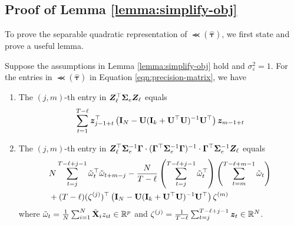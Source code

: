     

    
    \subsection{Proof of Lemma \ref{lemma:simplify-obj}}
    
    
    To prove the separable quadratic representation of $\Prec\left( \hat{\bm{\tau}}\right)$, we first state and prove a useful lemma.  
    \begin{lemma}\label{eqn:carryover-separate-obj}
    Suppose the assumptions in Lemma \ref{lemma:simplify-obj} hold and $\sigma_\varepsilon^2 = 1$. For the entries in $\Prec\left( \hat{\bm{\tau}}\right)$ in Equation \eqref{eqn:precision-matrix}, we have 
    \begin{enumerate}
        \item The $(j,m)$-th entry in $\bm{Z}_\ell^\top \bm{\Sigma}_e  \bm{Z}_\ell$ equals
        \begin{equation}\label{eqn:precision-entries-1}
            \sum_{t=1}^{T-\ell} \bm{z}_{j-1+t}^\top \left( \mathbf{I}_N - \mathbf{U}(\mathbf{I}_k + \mathbf{U}^\top \mathbf{U})^{-1} \mathbf{U}^\top  \right) \bm{z}_{m-1+t} 
        \end{equation}
        \item The $(j,m)$-th entry in $\bm{Z}_\ell^\top  \bm{\Sigma}^{-1}_e  \bm{\Gamma} \cdot (\bm{\Gamma}^\top \bm{\Sigma}^{-1}_e  \bm{\Gamma})^{-1} \cdot \bm{\Gamma}^\top \bm{\Sigma}^{-1}_e  \bm{Z}_\ell $ equals
        \begin{equation}\label{eqn:precision-entries-2}
            \begin{aligned}
                & N \sum_{t=j}^{T - \ell+j-1} \tilde \omega_t^\top \tilde \omega_{t+m-j}   - \frac{N}{T - \ell}  \left( \sum_{t=j}^{T - \ell+j-1} \tilde \omega_t^\top  \right)  \left( \sum_{t=m}^{T - \ell+m-1} \tilde \omega_t \right)  \\ & + (T - \ell) (\zeta^{(j)})^\top \left( \mathbf{I}_N - \mathbf{U} (\mathbf{I}_k + \mathbf{U}^\top \mathbf{U})^{-1} \mathbf{U}^\top \right) \zeta^{(m)} 
            \end{aligned}
        \end{equation}
        where $\tilde \omega_t = \frac{1}{N} \sum_{i = 1}^N \tilde{\mathbf{X}}_i z_{it} \in \mathbb{R}^p$ and $\zeta^{(j)} = \frac{1}{T - \ell} \sum_{t=j}^{T - \ell+j-1} \bm{z}_t \in \mathbb{R}^{N}$.
    \end{enumerate}
    
        
    \end{lemma}
    
    \texttt{}

